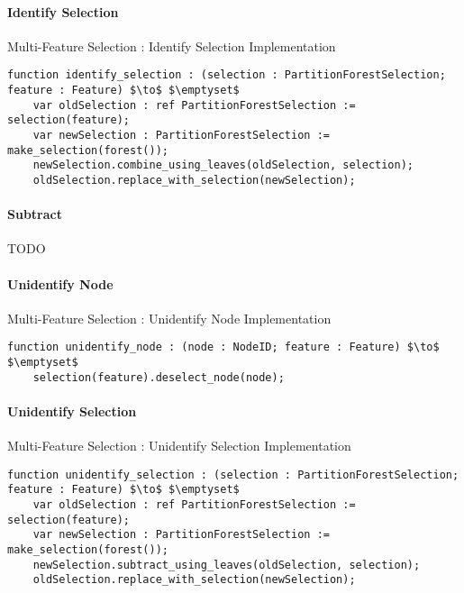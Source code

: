 \paragraph{Identify Selection}

\begin{stulisting}[H]
\caption{Multi-Feature Selection : Identify Selection Implementation}
\begin{lstlisting}[style=Default]
function identify_selection : (selection : PartitionForestSelection; feature : Feature) $\to$ $\emptyset$
	var oldSelection : ref PartitionForestSelection := selection(feature);
	var newSelection : PartitionForestSelection := make_selection(forest());
	newSelection.combine_using_leaves(oldSelection, selection);
	oldSelection.replace_with_selection(newSelection);
\end{lstlisting}
\end{stulisting}

\paragraph{Subtract}

TODO

\paragraph{Unidentify Node}

\begin{stulisting}[H]
\caption{Multi-Feature Selection : Unidentify Node Implementation}
\begin{lstlisting}[style=Default]
function unidentify_node : (node : NodeID; feature : Feature) $\to$ $\emptyset$
	selection(feature).deselect_node(node);
\end{lstlisting}
\end{stulisting}

\paragraph{Unidentify Selection}

\begin{stulisting}[H]
\caption{Multi-Feature Selection : Unidentify Selection Implementation}
\begin{lstlisting}[style=Default]
function unidentify_selection : (selection : PartitionForestSelection; feature : Feature) $\to$ $\emptyset$
	var oldSelection : ref PartitionForestSelection := selection(feature);
	var newSelection : PartitionForestSelection := make_selection(forest());
	newSelection.subtract_using_leaves(oldSelection, selection);
	oldSelection.replace_with_selection(newSelection);
\end{lstlisting}
\end{stulisting}
